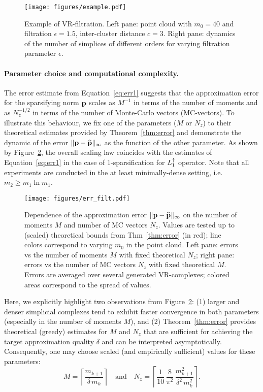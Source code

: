 \begin{figure}[t]
      \centering
      \texttt{[image: figures/example.pdf]}
      \caption{ Example of VR-filtration. Left pane: point cloud with \( m_0 = 40 \) and filtration \( \epsilon = 1.5 \), inter-cluster distance \( c = 3 \). Right pane: dynamics of the number of simplices of different orders for varying filtration parameter \( \epsilon\). \label{fig:example}}
\end{figure}

\paragraph{Parameter choice and computational complexity.} 
The error estimate from Equation~\ref{eq:err1} suggests that the approximation error for the sparsifying norm \( \mathbf{p} \) scales as \( M^{-1}\) in terms of the number of moments and as \( N_z^{-1/2}\) in terms of the number of Monte-Carlo vectors (MC-vectors). To illustrate this behaviour, we fix one of the parameters (\( M \) or \( N_z \)) to their theoretical estimates provided by Theorem~\ref{thm:error} and demonstrate the dynamic of the error \( \| \mathbf{p} - \widehat{\mathbf{p} }\|_\infty \) as the function of the other parameter. As shown by Figure~\ref{fig:M_Nz}, the overall scaling law coincides with the estimates of Equation~\ref{eq:err1} in the case of \(1 \)-sparsification for \( L_{1}^{\uparrow}\) operator. Note that all experiments are conducted in the at least minimally-dense setting, i.e. \( m_2 \ge m_1 \ln m_1 \).
\begin{figure}[t]
      \centering
      \texttt{[image: figures/err\_filt.pdf]}
      \caption{
            Dependence of the approximation error \( \| \mathbf{p} - \widehat{ \mathbf{p} } \|_\infty \) on the number of moments \( M \) and number of MC vectors \( N_z \). Values are tested up to (scaled) theoretical bounds from Thm~\ref{thm:error} (in red); line colors correspond to varying \( m_0 \) in the point cloud. Left pane: errors vs the number of moments \( M \) with fixed theoretical \( N_z \); right pane: errors vs the number of MC vectors \( N_z \) with fixed theoretical \( M \).  Errors are averaged over several generated VR-complexes; colored areas correspond to the spread of values. \label{fig:M_Nz}
      }
\end{figure}

Here, we explicitly highlight two observations from Figure~\ref{fig:M_Nz}: (1) larger and denser simplicial complexes tend to exhibit faster convergence in both parameters (especially in the number of moments \( M \)), and (2) Theorem~\ref{thm:error} provides theoretical (greedy) estimates for \( M \) and \( N_z \) that are sufficient for achieving the target approximation quality \(\delta\) and can be interpreted asymptotically. Consequently, one may choose scaled (and empirically sufficient) values for these parameters:
\[
M = \left\lceil \frac{m_{k+1}}{\delta\,m_k} \right\rceil
\quad\text{and}\quad
N_z = \left\lceil \frac{1}{10}\,\frac{8}{\pi^2}\,\frac{m_{k+1}^2}{\delta^2\,m_k^2} \right\rceil.
\]

